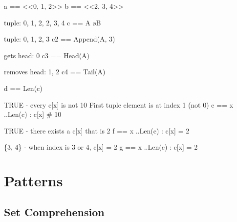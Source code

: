 \begin{tla}
a == <<0, 1, 2>>                    
b == <<2, 3, 4>>

\* tuple: 0, 1, 2, 2, 3, 4
c == A \o B

\* tuple: 0, 1, 2, 3
c2 == Append(A, 3) 

\* gets head: 0
c3 == Head(A) 

\* removes head: 1, 2
c4 == Tail(A) 

d == Len(c)                         

\* TRUE - every c[x] is not 10
\* First tuple element is at index 1 (not 0)
e == \A x ..Len(c) : c[x] # 10 

\* TRUE - there exists a c[x] that is 2
f == \E x ..Len(c) : c[x] = 2

\* \{3, 4\} - when index is 3 or 4, c[x] = 2
g == {x ..Len(c) : c[x] = 2}   
\end{tla}
\begin{tlatex}
%
%
\@pvspace{8.0pt}%
\@x{}%
%
\@xx{}%
%
\@pvspace{8.0pt}%
\@x{}%
%
\@xx{}%
%
\@pvspace{8.0pt}%
\@x{}%
%
\@xx{}%
%
\@pvspace{8.0pt}%
\@x{}%
%
\@xx{}%
%
\@pvspace{8.0pt}%
\@x{}%
%
\@xx{}%
%
\@pvspace{8.0pt}%
\@x{}%
%
\@xx{}%
\@x{}%
%
\@xx{}%
\@pvspace{8.0pt}%
\@x{}%
%
\@xx{}%
\@pvspace{8.0pt}%
\@x{}%
%
\@xx{}%
\end{tlatex}

\section{Patterns}

\subsection{Set Comprehension}

